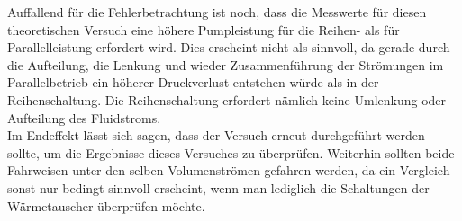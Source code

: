 Auffallend für die Fehlerbetrachtung ist noch, dass die Messwerte für diesen theoretischen Versuch eine höhere Pumpleistung für die Reihen- als für Parallelleistung erfordert wird. Dies erscheint nicht als sinnvoll, da gerade durch die Aufteilung, die Lenkung und wieder Zusammenführung der Strömungen im Parallelbetrieb ein höherer Druckverlust entstehen würde als in der Reihenschaltung. Die Reihenschaltung erfordert nämlich keine Umlenkung oder Aufteilung des Fluidstroms.\\

Im Endeffekt lässt sich sagen, dass der Versuch erneut durchgeführt werden sollte, um die Ergebnisse dieses Versuches zu überprüfen. Weiterhin sollten beide Fahrweisen unter den selben Volumenströmen gefahren werden, da ein Vergleich sonst nur bedingt sinnvoll erscheint, wenn man lediglich die Schaltungen der Wärmetauscher überprüfen möchte.